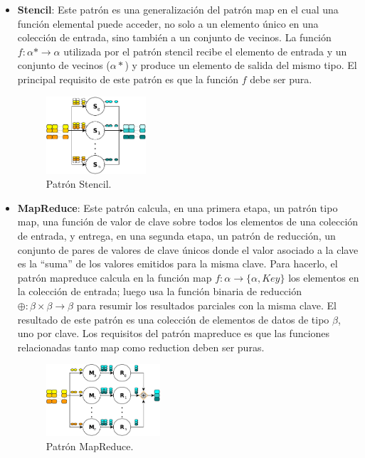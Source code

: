 \begin{itemize}
    \item \textbf{Stencil}: Este patrón es una generalización del patrón map en el cual una función elemental puede acceder, no solo a un elemento único en una colección de entrada, sino también a un conjunto de vecinos. La función $f: \alpha* \rightarrow \alpha$ utilizada por el patrón stencil recibe el elemento de entrada y un conjunto de vecinos ($\alpha*$) y produce un elemento de salida del mismo tipo. El principal requisito de este patrón es que la función $f$ debe ser pura. 
    
    \vspace{0.35cm}
    \begin{figure}[htb]
    \centering
    \includegraphics[width=0.35\textwidth]{figures/stencil.pdf}
    \caption{Patrón Stencil.}
    \label{fig:chap3:stencil}
    \end{figure}
    \vspace{0.35cm}
    
    \item \textbf{MapReduce}: Este patrón calcula, en una primera etapa, un patrón tipo map, una función de valor de clave sobre todos los elementos de una colección de entrada, y entrega, en una segunda etapa, un patrón de reducción, un conjunto de pares de valores de clave únicos donde el valor asociado a la clave es la ``suma'' de los valores emitidos para la misma clave. Para hacerlo, el patrón mapreduce calcula en la función map $f : \alpha \rightarrow \{\alpha, Key\}$ los elementos en la colección de entrada; luego usa la función binaria de reducción $\oplus: \beta \times \beta \to \beta$ para resumir los resultados parciales con la misma clave. El resultado de este patrón es una colección de elementos de datos de tipo $\beta$, uno por clave. Los requisitos del patrón mapreduce es que las funciones relacionadas tanto map como reduction deben ser puras.
    
    \vspace{0.35cm}
    \begin{figure}[htb]
    \centering
    \includegraphics[width=0.40\textwidth]{figures/mapreduce.pdf}
    \caption{Patrón MapReduce.}
    \label{fig:chap3:mapreduce}
    \end{figure}
    \vspace{0.35cm}
    

\end{itemize}
